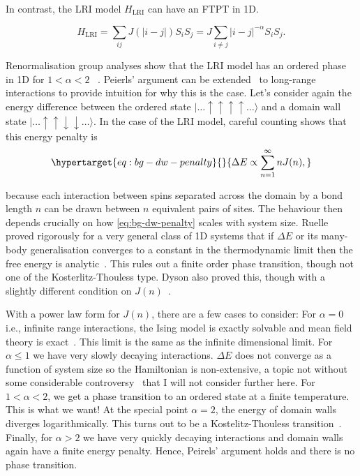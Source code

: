 In contrast, the LRI model \(H_{\mathrm{LRI}}\) can have an FTPT in 1D.

\[H_{\mathrm{LRI}} = \sum_{ij} J(|i-j|) S_i S_j = J \sum_{i\neq j} |i - j|^{-\alpha} S_i S_j.\]

Renormalisation group analyses show that the LRI model has an ordered phase in 1D for \(1 < \alpha < 2\) ~\autocite{dysonExistencePhasetransitionOnedimensional1969}. Peierls' argument can be extended~\autocite{thoulessLongRangeOrderOneDimensional1969} to long-range interactions to provide intuition for why this is the case. Let's consider again the energy difference between the ordered state \(|\ldots\uparrow\uparrow\uparrow\uparrow\ldots\rangle\) and a domain wall state \(|\ldots\uparrow\uparrow\downarrow\downarrow\ldots\rangle\). In the case of the LRI model, careful counting shows that this energy penalty is \begin{equation}\protect\hypertarget{eq:bg-dw-penalty}{}{\Delta E \propto \sum_{n=1}^{\infty} n J(n),}\label{eq:bg-dw-penalty}\end{equation}

because each interaction between spins separated across the domain by a bond length \(n\) can be drawn between \(n\) equivalent pairs of sites. The behaviour then depends crucially on how \cref{eq:bg-dw-penalty} scales with system size. Ruelle proved rigorously for a very general class of 1D systems that if \(\Delta E\) or its many-body generalisation converges to a constant in the thermodynamic limit then the free energy is analytic~\autocite{ruelleStatisticalMechanicsOnedimensional1968}. This rules out a finite order phase transition, though not one of the Kosterlitz-Thouless type. Dyson also proved this, though with a slightly different condition on \(J(n)\)~\autocite{dysonExistencePhasetransitionOnedimensional1969}.

With a power law form for \(J(n)\), there are a few cases to consider: For \(\alpha = 0\) i.e., infinite range interactions, the Ising model is exactly solvable and mean field theory is exact~\autocite{lipkinValidityManybodyApproximation1965}. This limit is the same as the infinite dimensional limit. For \(\alpha \leq 1\) we have very slowly decaying interactions. \(\Delta E\) does not converge as a function of system size so the Hamiltonian is non-extensive, a topic not without some considerable controversy~\autocite{grossNonextensiveHamiltonianSystems2002,lutskoQuestioningValidityNonextensive2011,wangCommentNonextensiveHamiltonian2003} that I will not consider further here. For \(1 < \alpha < 2\), we get a phase transition to an ordered state at a finite temperature. This is what we want! At the special point \(\alpha = 2\), the energy of domain walls diverges logarithmically. This turns out to be a Kostelitz-Thouless transition~\autocite{thoulessLongRangeOrderOneDimensional1969}. Finally, for \(\alpha > 2\) we have very quickly decaying interactions and domain walls again have a finite energy penalty. Hence, Peirels' argument holds and there is no phase transition.

